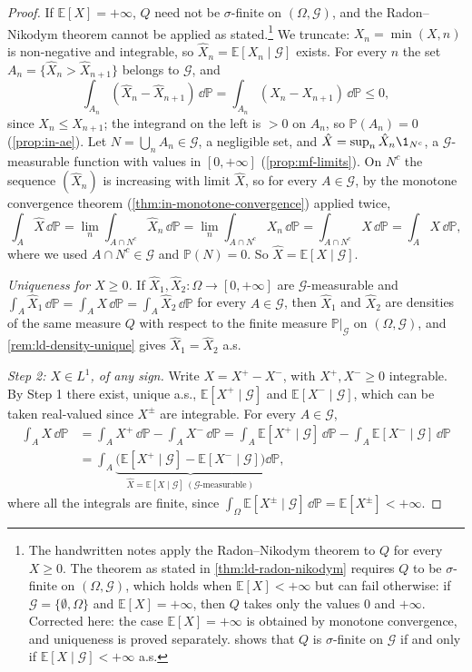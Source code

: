 \begin{proof}
If $\mathbb E[X]=+\infty$, $Q$ need not be $\sigma$-finite on $(\Omega,\mathcal G)$, and the
Radon--Nikodym theorem cannot be applied as stated.\footnote{The handwritten notes apply the
Radon--Nikodym theorem to $Q$ for every $X\ge0$. The theorem as stated in
\cref{thm:ld-radon-nikodym} requires $Q$ to be $\sigma$-finite on $(\Omega,\mathcal G)$, which holds
when $\mathbb E[X]<+\infty$ but can fail otherwise: if $\mathcal G=\{\emptyset,\Omega\}$ and
$\mathbb E[X]=+\infty$, then $Q$ takes only the values $0$ and $+\infty$. Corrected here: the case
$\mathbb E[X]=+\infty$ is obtained by monotone convergence, and uniqueness is proved
separately.  shows that $Q$ is $\sigma$-finite on $\mathcal G$ if and
only if $\mathbb E[X\mid\mathcal G]<+\infty$ a.s.} We truncate: $X_n=\min(X,n)$ is non-negative
and integrable, so $\hat X_n=\mathbb E[X_n\mid\mathcal G]$ exists. For every $n$ the set
$A_n=\{\hat X_n>\hat X_{n+1}\}$ belongs to $\mathcal G$, and
\[
  \int_{A_n}(\hat X_n-\hat X_{n+1})\,\dd\mathbb P=\int_{A_n}(X_n-X_{n+1})\,\dd\mathbb P\le0,
\]
since $X_n\le X_{n+1}$; the integrand on the left is $>0$ on $A_n$, so $\mathbb P(A_n)=0$
(\cref{prop:in-ae}). Let $N=\bigcup_nA_n\in\mathcal G$, a negligible set, and
$\hat X=\sup_n\hat X_n\1_{N^c}$, a $\mathcal G$-measurable function with values in
$[0,+\infty]$ (\cref{prop:mf-limits}). On $N^c$ the sequence $(\hat X_n)$ is increasing with
limit $\hat X$, so for every $A\in\mathcal G$, by the monotone convergence theorem
(\cref{thm:in-monotone-convergence}) applied twice,
\[
  \int_A\hat X\,\dd\mathbb P=\lim_n\int_{A\cap N^c}\hat X_n\,\dd\mathbb P
  =\lim_n\int_{A\cap N^c}X_n\,\dd\mathbb P=\int_{A\cap N^c}X\,\dd\mathbb P=\int_AX\,\dd\mathbb P,
\]
where we used $A\cap N^c\in\mathcal G$ and $\mathbb P(N)=0$. So $\hat X=\mathbb E[X\mid\mathcal G]$.

\emph{Uniqueness for $X\ge0$.} If $\hat X_1,\hat X_2:\Omega\to[0,+\infty]$ are
$\mathcal G$-measurable and $\int_A\hat X_1\,\dd\mathbb P=\int_AX\,\dd\mathbb P=\int_A\hat X_2\,\dd\mathbb P$
for every $A\in\mathcal G$, then $\hat X_1$ and $\hat X_2$ are densities of the same measure $Q$
with respect to the finite measure $\mathbb P|_{\mathcal G}$ on $(\Omega,\mathcal G)$, and
\cref{rem:ld-density-unique} gives $\hat X_1=\hat X_2$ a.s.

\emph{Step 2: $X\in L^1$, of any sign.} Write $X=X^+-X^-$, with $X^+,X^-\ge0$ integrable. By Step 1
there exist, unique a.s., $\mathbb E[X^+\mid\mathcal G]$ and $\mathbb E[X^-\mid\mathcal G]$,
which can be taken real-valued since $X^\pm$ are integrable. For every $A\in\mathcal G$,
\[
\begin{aligned}
  \int_AX\,\dd\mathbb P&=\int_AX^+\,\dd\mathbb P-\int_AX^-\,\dd\mathbb P
  =\int_A\mathbb E[X^+\mid\mathcal G]\,\dd\mathbb P-\int_A\mathbb E[X^-\mid\mathcal G]\,\dd\mathbb P\\
  &=\int_A\underbrace{\big(\mathbb E[X^+\mid\mathcal G]-\mathbb E[X^-\mid\mathcal G]\big)}_{\hat X=\mathbb E[X\mid\mathcal G]\ (\mathcal G\text{-measurable})}\dd\mathbb P,
\end{aligned}
\]
where all the integrals are finite, since $\int_\Omega\mathbb E[X^\pm\mid\mathcal G]\,\dd\mathbb P=\mathbb E[X^\pm]<+\infty$.


\end{proof}

